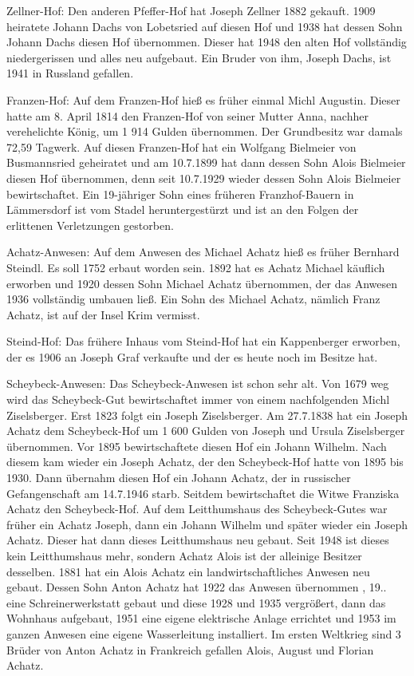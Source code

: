 \documentclass{book}
\begin{document}
Zellner-Hof: Den anderen Pfeffer-Hof hat Joseph Zellner 1882 gekauft. 1909
heiratete Johann Dachs von Lobetsried auf diesen Hof und 1938 hat dessen Sohn
Johann Dachs diesen Hof übernommen. Dieser hat 1948 den alten Hof vollständig
niedergerissen und alles neu aufgebaut. Ein Bruder von ihm, Joseph Dachs, ist
1941 in Russland gefallen.

Franzen-Hof: Auf dem Franzen-Hof hieß es früher einmal Michl Augustin. Dieser
hatte am 8. April 1814 den Franzen-Hof von seiner Mutter Anna, nachher
verehelichte König, um 1 914 Gulden übernommen. Der Grundbesitz war damals 72,59
Tagwerk. Auf diesen Franzen-Hof hat ein Wolfgang Bielmeier von Busmannsried
geheiratet und am 10.7.1899 hat dann dessen Sohn Alois Bielmeier diesen Hof
übernommen, denn seit 10.7.1929 wieder dessen Sohn Alois Bielmeier
bewirtschaftet. Ein 19-jähriger Sohn eines früheren Franzhof-Bauern in
Lämmersdorf ist vom Stadel heruntergestürzt und ist an den Folgen der erlittenen
Verletzungen gestorben.

Achatz-Anwesen: Auf dem Anwesen des Michael Achatz hieß es früher Bernhard
Steindl. Es soll 1752 erbaut worden sein. 1892 hat es Achatz Michael käuflich
erworben und 1920 dessen Sohn Michael Achatz übernommen, der das Anwesen 1936
vollständig umbauen ließ. Ein Sohn des Michael Achatz, nämlich Franz Achatz, ist
auf der Insel Krim vermisst.

Steind-Hof: Das frühere Inhaus vom Steind-Hof hat ein Kappenberger erworben, der
es 1906 an Joseph Graf verkaufte und der es heute noch im Besitze hat.

Scheybeck-Anwesen: Das Scheybeck-Anwesen ist schon sehr alt. Von 1679 weg wird
das Scheybeck-Gut bewirtschaftet immer von einem nachfolgenden Michl
Ziselsberger. Erst 1823 folgt ein Joseph Ziselsberger. Am 27.7.1838 hat ein
Joseph Achatz dem Scheybeck-Hof um 1 600 Gulden von Joseph und Ursula
Ziselsberger übernommen. Vor 1895 bewirtschaftete diesen Hof ein Johann Wilhelm.
Nach diesem kam wieder ein Joseph Achatz, der den Scheybeck-Hof hatte von 1895
bis 1930. Dann übernahm diesen Hof ein Johann Achatz, der in russischer
Gefangenschaft am 14.7.1946 starb. Seitdem bewirtschaftet die Witwe Franziska
Achatz den Scheybeck-Hof. Auf dem Leitthumshaus des Scheybeck-Gutes war früher
ein Achatz Joseph, dann ein Johann Wilhelm und später wieder ein Joseph Achatz.
Dieser hat dann dieses Leitthumshaus neu gebaut. Seit 1948 ist dieses kein
Leitthumshaus mehr, sondern Achatz Alois ist der alleinige Besitzer desselben.
1881 hat ein Alois Achatz ein landwirtschaftliches Anwesen neu gebaut. Dessen
Sohn Anton Achatz hat 1922 das Anwesen übernommen , 19.. eine Schreinerwerkstatt
gebaut und diese 1928 und 1935 vergrößert, dann das Wohnhaus aufgebaut, 1951
eine eigene elektrische Anlage errichtet und 1953 im ganzen Anwesen eine eigene
Wasserleitung installiert. Im ersten Weltkrieg sind 3 Brüder von Anton Achatz in
Frankreich gefallen Alois, August und Florian Achatz.
\end{document}

